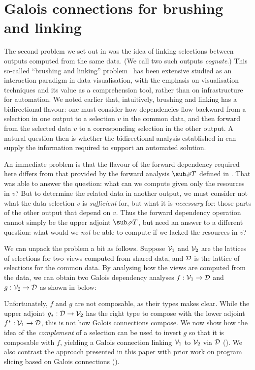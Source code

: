 \section{Galois connections for brushing and linking}
\label{sec:toolkit}

The second problem we set out in  was the idea of linking selections between outputs computed from the same data. (We call two such outputs \emph{cognate}.) This so-called ``brushing and linking'' problem~\cite{becker87} has been extensive studied as an interaction paradigm in data visualisation, with the emphasis on visualisation techniques and its value as a comprehension tool, rather than on infrastructure for automation. We noted earlier that, intuitively, brushing and linking has a bidirectional flavour: one must consider how dependencies flow backward from a selection in one output to a selection $v$ in the common data, and then forward from the selected data $v$ to a corresponding selection in the other output. A natural question then is whether the bidirectional analysis established in  can supply the information required to support an automated solution.

An immediate problem is that the flavour of the forward dependency required here differs from that provided by the forward analysis $\evalFwdF{T}$ defined in . That was able to answer the question: what can we compute given only the resources in $v$? But to determine the related data in another output, we must consider not what the data selection $v$ is \emph{sufficient} for, but what it is \emph{necessary} for: those parts of the other output that depend on $v$. Thus the forward dependency operation cannot simply be the upper adjoint $\evalFwdF{T}$, but need an answer to a different question: what would we \emph{not} be able to compute if we lacked the resources in $v$?

We can unpack the problem a bit as follows. Suppose $\mathcal{V}_1$ and $\mathcal{V}_2$ are the lattices of selections for two views computed from shared data, and $\mathcal{D}$ is the lattice of selections for the common data. By analysing how the views are computed from the data, we can obtain two Galois dependency analyses $f: \mathcal{V}_1 \to \mathcal{D}$ and $g: \mathcal{V}_2 \to \mathcal{D}$ as shown in  below:



\noindent Unfortunately, $f$ and $g$ are not composable, as their types makes clear. While the upper adjoint ${g}_*: \mathcal{D} \to \mathcal{V}_2$ has the right type to compose with the lower adjoint ${f}^*: \mathcal{V}_1 \to \mathcal{D}$, this is not how Galois connections compose. We now show how the idea of the \emph{complement} of a selection can be used to invert $g$ so that it is composable with $f$, yielding a Galois connection linking $\mathcal{V}_1$ to $\mathcal{V}_2$ via $\mathcal{D}$ (). We also contrast the approach presented in this paper with prior work on program slicing based on Galois connections ().

